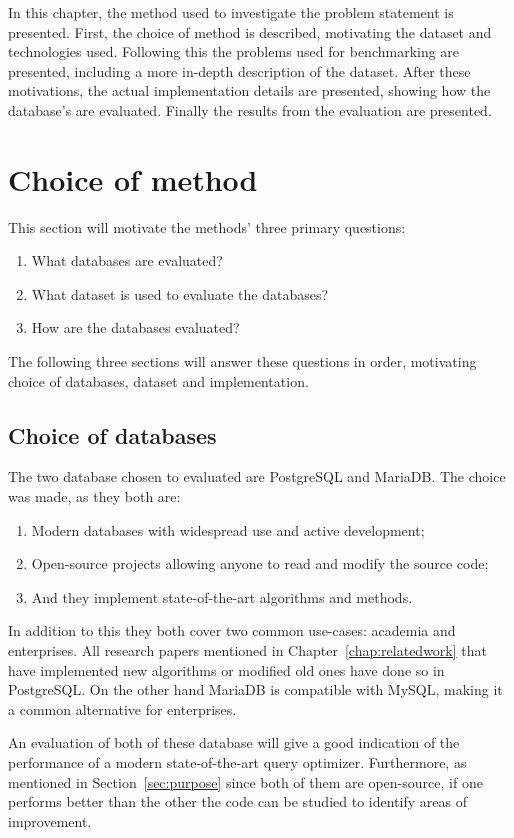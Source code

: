 In this chapter, the method used to investigate the problem statement is
presented. First, the choice of method is described, motivating the dataset and
technologies used. Following this the problems used for benchmarking are
presented, including a more in-depth description of the dataset. After these
motivations, the actual implementation details are presented, showing how the
database's are evaluated. Finally the results from the evaluation are presented.

\section{Choice of method}\label{sec:choiceofmethod}
This section will motivate the methods' three primary questions:
\begin{enumerate}
\item What databases are evaluated?
\item What dataset is used to evaluate the databases?
\item How are the databases evaluated?
\end{enumerate}

The following three sections will answer these questions in order, motivating
choice of databases, dataset and implementation.

\subsection{Choice of databases}\label{sec:choiceofdatabases}
The two database chosen to evaluated are PostgreSQL and MariaDB. The choice was
made, as they both are:
\begin{enumerate}
\item Modern databases with widespread use and active development;
\item Open-source projects allowing anyone to read and modify the source code;
\item And they implement state-of-the-art algorithms and methods.
\end{enumerate}

In addition to this they both cover two common use-cases: academia and
enterprises. All research papers mentioned in Chapter~\ref{chap:relatedwork} that have
implemented new algorithms or modified old ones have done so in PostgreSQL.
On the other hand MariaDB is compatible with MySQL, making it a common
alternative for enterprises.

An evaluation of both of these database will give a good indication of the
performance of a modern state-of-the-art query optimizer. Furthermore, as
mentioned in Section~\ref{sec:purpose} since both of them are open-source, if
one performs better than the other the code can be studied to identify areas of
improvement.

